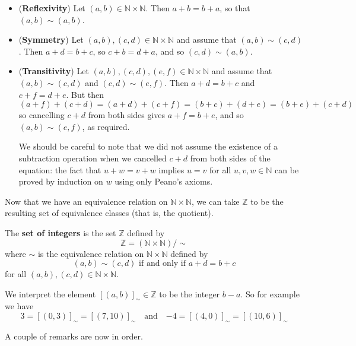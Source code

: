\begin{cproof}
\fixlistskip%
\begin{itemize}
\item (\textbf{Reflexivity}) Let $(a,b) \in \mathbb{N} \times \mathbb{N}$. Then $a+b = b+a$, so that $(a,b) \sim (a,b)$.
\item (\textbf{Symmetry}) Let $(a,b), (c,d) \in \mathbb{N} \times \mathbb{N}$ and assume that $(a,b) \sim (c,d)$. Then $a+d=b+c$, so $c+b=d+a$, and so $(c,d) \sim (a,b)$.
\item (\textbf{Transitivity}) Let $(a,b), (c,d), (e,f) \in \mathbb{N} \times \mathbb{N}$ and assume that $(a,b) \sim (c,d)$ and $(c,d) \sim (e,f)$. Then $a+d=b+c$ and $c+f=d+e$. But then
\[ (a + f) + (c + d) = (a+d) + (c+f) = (b+c) + (d+e) = (b+e) + (c+d) \]
so cancelling $c+d$ from both sides gives $a+f = b+e$, and so $(a,b) \sim (e,f)$, as required.

We should be careful to note that we did not assume the existence of a subtraction operation when we cancelled $c+d$ from both sides of the equation: the fact that $u+w=v+w$ implies $u=v$ for all $u,v,w \in \mathbb{N}$ can be proved by induction on $w$ using only Peano's axioms.
\fixlistskip%
\end{itemize}
\end{cproof}

Now that we have an equivalence relation on $\mathbb{N} \times \mathbb{N}$, we can take $\mathbb{Z}$ to be the resulting set of equivalence classes (that is, the quotient).

\begin{construction}
\label{cnsIntegersFromNaturalNumbers}
The \textbf{set of integers} is the set $\mathbb{Z}$ defined by
\[ \mathbb{Z} = (\mathbb{N} \times \mathbb{N})/{\sim} \]
where $\sim$ is the equivalence relation on $\mathbb{N} \times \mathbb{N}$ defined by
\[ (a,b) \sim (c,d) \text{ if and only if } a+d=b+c \]
for all $(a,b),(c,d) \in \mathbb{N} \times \mathbb{N}$.
\end{construction}

We interpret the element $[(a,b)]_{\sim} \in \mathbb{Z}$ to be the integer $b-a$. So for example we have
\[ 3 = [(0,3)]_{\sim} = [(7,10)]_{\sim} \quad \text{and} \quad {-4} = [(4,0)]_{\sim} = [(10,6)]_{\sim} \]

A couple of remarks are now in order.


